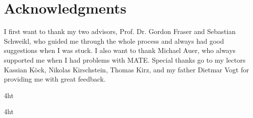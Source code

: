 \documentclass[
  a4paper,  %
  twoside,  %
  bibliography=totoc,
  headsepline,
  cleardoublepage=empty,
  parskip=half,
  draft=false
]{scrbook}
\begin{document}
\cleardoublepage

\chapter*{Acknowledgments}
I first want to thank my two advisors, Prof. Dr. Gordon Fraser and Sebastian Schweikl, who guided me through the whole process and always had good suggestions when I was stuck.
I also want to thank Michael Auer, who always supported me when I had problems with MATE.
Special thanks go to my lectors Kassian Köck, Nikolas Kirschstein, Thomas Kirz, and my father Dietmar Vogt for providing me with great feedback.




\iftex4ht
\else
\fi

%
%

%
%
%
\tableofcontents


\listoffigures
\listoftables

\iffalse
\ifdeutsch
  \listof{Listing}{Verzeichnis der Listings}
\else
\fi
\fi

\iffalse
\ifdeutsch
  \listof{Algorithmus}{Verzeichnis der Algorithmen}
\else
\fi
\fi

\printnoidxglossaries

\iftex4ht
\else
\fi
\end{document}

